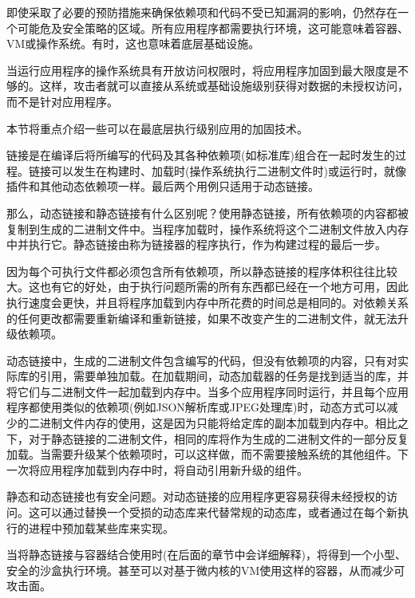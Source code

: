 
即使采取了必要的预防措施来确保依赖项和代码不受已知漏洞的影响，仍然存在一个可能危及安全策略的区域。所有应用程序都需要执行环境，这可能意味着容器、VM或操作系统。有时，这也意味着底层基础设施。

当运行应用程序的操作系统具有开放访问权限时，将应用程序加固到最大限度是不够的。这样，攻击者就可以直接从系统或基础设施级别获得对数据的未授权访问，而不是针对应用程序。

本节将重点介绍一些可以在最底层执行级别应用的加固技术。


链接是在编译后将所编写的代码及其各种依赖项(如标准库)组合在一起时发生的过程。链接可以发生在构建时、加载时(操作系统执行二进制文件时)或运行时，就像插件和其他动态依赖项一样。最后两个用例只适用于动态链接。

那么，动态链接和静态链接有什么区别呢？使用静态链接，所有依赖项的内容都被复制到生成的二进制文件中。当程序加载时，操作系统将这个二进制文件放入内存中并执行它。静态链接由称为链接器的程序执行，作为构建过程的最后一步。

因为每个可执行文件都必须包含所有依赖项，所以静态链接的程序体积往往比较大。这也有它的好处，由于执行问题所需的所有东西都已经在一个地方可用，因此执行速度会更快，并且将程序加载到内存中所花费的时间总是相同的。对依赖关系的任何更改都需要重新编译和重新链接，如果不改变产生的二进制文件，就无法升级依赖项。

动态链接中，生成的二进制文件包含编写的代码，但没有依赖项的内容，只有对实际库的引用，需要单独加载。在加载期间，动态加载器的任务是找到适当的库，并将它们与二进制文件一起加载到内存中。当多个应用程序同时运行，并且每个应用程序都使用类似的依赖项(例如JSON解析库或JPEG处理库)时，动态方式可以减少的二进制文件内存的使用，这是因为只能将给定库的副本加载到内存中。相比之下，对于静态链接的二进制文件，相同的库将作为生成的二进制文件的一部分反复加载。当需要升级某个依赖项时，可以这样做，而不需要接触系统的其他组件。下一次将应用程序加载到内存中时，将自动引用新升级的组件。

静态和动态链接也有安全问题。对动态链接的应用程序更容易获得未经授权的访问。这可以通过替换一个受损的动态库来代替常规的动态库，或者通过在每个新执行的进程中预加载某些库来实现。

当将静态链接与容器结合使用时(在后面的章节中会详细解释)，将得到一个小型、安全的沙盒执行环境。甚至可以对基于微内核的VM使用这样的容器，从而减少可攻击面。


